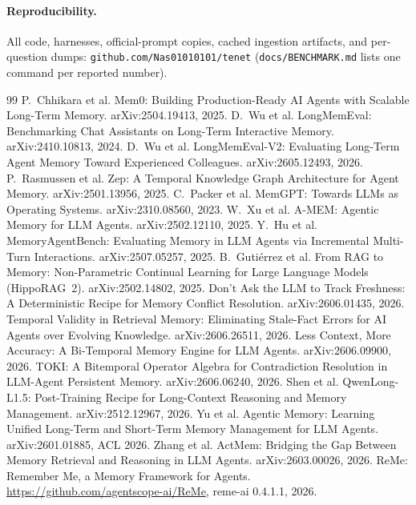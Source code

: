 \documentclass[11pt]{article}
\begin{document}
\paragraph{Reproducibility.} All code, harnesses, official-prompt copies, cached
ingestion artifacts, and per-question dumps: \texttt{github.com/Nas01010101/tenet}
(\texttt{docs/BENCHMARK.md} lists one command per reported number).

\begin{thebibliography}{99}\small
{} P.~Chhikara et al. Mem0: Building Production-Ready AI Agents with Scalable
Long-Term Memory. arXiv:2504.19413, 2025.
 D.~Wu et al. LongMemEval: Benchmarking Chat Assistants on Long-Term
Interactive Memory. arXiv:2410.10813, 2024.
 D.~Wu et al. LongMemEval-V2: Evaluating Long-Term Agent Memory Toward
Experienced Colleagues. arXiv:2605.12493, 2026.
 P.~Rasmussen et al. Zep: A Temporal Knowledge Graph Architecture for Agent
Memory. arXiv:2501.13956, 2025.
 C.~Packer et al. MemGPT: Towards LLMs as Operating Systems.
arXiv:2310.08560, 2023.
 W.~Xu et al. A-MEM: Agentic Memory for LLM Agents. arXiv:2502.12110, 2025.
 Y.~Hu et al. MemoryAgentBench: Evaluating Memory in LLM Agents via
Incremental Multi-Turn Interactions. arXiv:2507.05257, 2025.
 B.~Guti\'errez et al. From RAG to Memory: Non-Parametric Continual
Learning for Large Language Models (HippoRAG~2). arXiv:2502.14802, 2025.
 Don't Ask the LLM to Track Freshness: A Deterministic Recipe for
Memory Conflict Resolution. arXiv:2606.01435, 2026.
 Temporal Validity in Retrieval Memory: Eliminating Stale-Fact Errors
for AI Agents over Evolving Knowledge. arXiv:2606.26511, 2026.
 Less Context, More Accuracy: A Bi-Temporal Memory Engine for LLM Agents.
arXiv:2606.09900, 2026.
 TOKI: A Bitemporal Operator Algebra for Contradiction Resolution in
LLM-Agent Persistent Memory. arXiv:2606.06240, 2026.
 Shen et al. QwenLong-L1.5: Post-Training Recipe for Long-Context
Reasoning and Memory Management. arXiv:2512.12967, 2026.
 Yu et al. Agentic Memory: Learning Unified Long-Term and Short-Term
Memory Management for LLM Agents. arXiv:2601.01885, ACL 2026.
 Zhang et al. ActMem: Bridging the Gap Between Memory Retrieval and
Reasoning in LLM Agents. arXiv:2603.00026, 2026.
 ReMe: Remember Me, a Memory Framework for Agents.
  \url{https://github.com/agentscope-ai/ReMe}, reme-ai 0.4.1.1, 2026.

\end{thebibliography}
\end{document}
